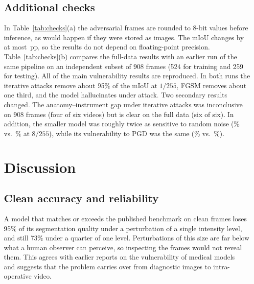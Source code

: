 \documentclass[conference]{IEEEtran}
\newcommand{\pp}{\,pp}
\begin{document}
\subsection{Additional checks}
In Table~\ref{tab:checks}(a) the adversarial frames are rounded to 8-bit values before inference, as would happen if they were stored as images. The mIoU changes by at most \nQuantMax\pp, so the results do not depend on floating-point precision. Table~\ref{tab:checks}(b) compares the full-data results with an earlier run of the same pipeline on an independent subset of 908 frames (524 for training and 259 for testing). All of the main vulnerability results are reproduced. In both runs the iterative attacks remove about 95\% of the mIoU at $1/255$, FGSM removes about one third, and the model hallucinates under attack. Two secondary results changed. The anatomy--instrument gap under iterative attacks was inconclusive on 908 frames (four of six videos) but is clear on the full data (six of six). In addition, the smaller model was roughly twice as sensitive to random noise (\nRepNoiseEight\% vs.\ \nNoiseEightFall\% at $8/255$), while its vulnerability to PGD was the same (\nRepPGDOne\% vs.\ \nPGDOneFall\%).

\begin{table}[t]
\centering
\caption{Additional checks: (a) 8-bit quantisation of the adversarial frame; (b) repetition of the study on an independent run with 908 frames.}
\label{tab:checks}
\footnotesize
\setlength{\tabcolsep}{3.5pt}

\end{table}

\section{Discussion}

\subsection{Clean accuracy and reliability}
A model that matches or exceeds the published benchmark on clean frames loses 95\% of its segmentation quality under a perturbation of a single intensity level, and still 73\% under a quarter of one level. Perturbations of this size are far below what a human observer can perceive, so inspecting the frames would not reveal them. This agrees with earlier reports on the vulnerability of medical models~\cite{finlayson2018adversarial,ma2021understanding} and suggests that the problem carries over from diagnostic images to intra-operative video.
\end{document}
